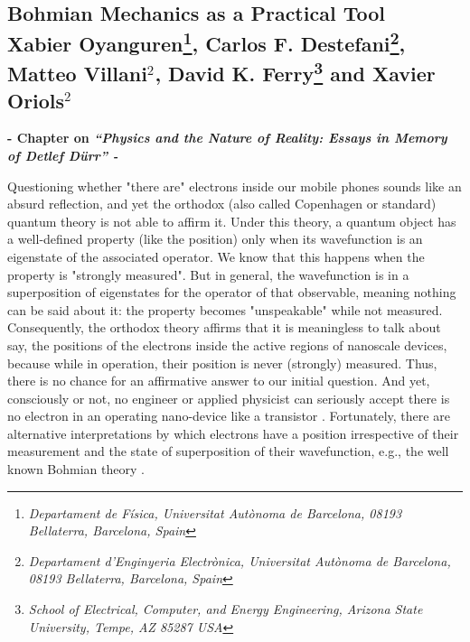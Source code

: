 \documentclass[11pt, a4paper]{article} %
\begin{document}
\newpage
{}
\setcounter{page}{1}
\begin{center}
\section*{ Bohmian Mechanics as a Practical Tool \vspace{0.2cm}\vspace{0.1cm}\\ \small Xabier Oyanguren\footnote{\em Departament de Física, Universitat Autònoma de Barcelona, 08193 Bellaterra, Barcelona, Spain}, Carlos F. Destefani\footnote{\em Departament d’Enginyeria Electrònica, Universitat Autònoma de Barcelona, 08193 Bellaterra, Barcelona, Spain}, Matteo Villani$^2$, David K. Ferry\footnote{\em School of Electrical, Computer, and Energy Engineering, Arizona State University, Tempe,
AZ 85287 USA} and Xavier Oriols$^2$}
\vspace{-0.5cm}
{\bf \small - Chapter on {\em “Physics and the Nature of Reality: Essays in Memory of Detlef Dürr” - }}\vspace{-0.32cm}
\end{center}

\hspace*{4mm} Questioning whether "there are" electrons inside our mobile phones sounds like an absurd reflection, and yet the orthodox (also called Copenhagen or standard) quantum theory is not able to affirm it. Under this theory, a quantum object has a well-defined property (like the position) only when its wavefunction is an eigenstate of the associated operator. We know that this happens when the property is "strongly measured". But in general, the wavefunction is in a superposition of eigenstates for the operator of that observable, meaning nothing can be said about it: the property becomes "unspeakable" while not measured. Consequently, the orthodox theory affirms that it is meaningless to talk about say, the positions of the electrons inside the active regions of nanoscale devices, because while in operation, their position is never (strongly) measured. Thus, there is no chance for an affirmative answer to our initial question. And yet, consciously or not, no engineer or applied physicist can seriously accept there is no electron in an operating nano-device like a transistor \cite{where}. Fortunately, there are alternative interpretations by which electrons have a position irrespective of their measurement and the state of superposition of their wavefunction, e.g., the well known Bohmian theory \cite{Bohm,Holland, Durr,JordiXavier}. \vspace{-0.07cm} 
\end{document}
